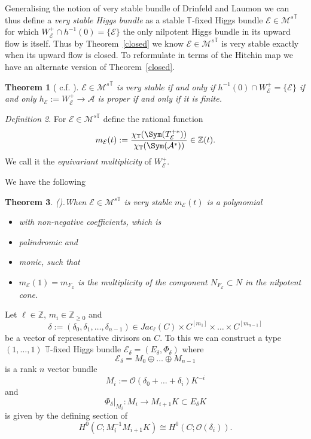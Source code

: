 \documentclass[12pt]{article}
\numberwithin{equation}{section}
\newtheorem{theorem}{Theorem}
\theoremstyle{remark}
\newtheorem{definition}[theorem]{Definition}
\numberwithin{theorem}{section}
\def\calE{{\mathcal E}}
\def\M{{\mathcal{M}}}
\def\calA{{\mathcal{A}}}
\def\N{\mathbb{Z}_{\geq 0}}
\newcommand{\T}{{\mathbb{T}}}
\def\calO{{\mathcal O}}
\def\Z{\mathbb{Z}}
\numberwithin{equation}{section}
\begin{document}
Generalising the notion of very stable bundle of Drinfeld and Laumon \cite{drinfeld2,laumon1} we can thus define a {\em very stable Higgs bundle} as a stable $\T$-fixed Higgs bundle $\calE\in {\M^s}^\T$ for which $W^+_\calE\cap h^{-1}(0)=\{\calE\}$ the only nilpotent Higgs bundle in its upward flow is itself. Thus by Theorem~\ref{closed} we know $\calE\in  {\M^s}^\T$ is very stable exactly when its upward flow is closed. To reformulate in terms of the Hitchin map we have an alternate version of Theorem~\ref{closed}.
\begin{theorem}[\cite{hausel-hitchin1} c.f. \cite{zelaci}] \label{proper}
	$\calE \in {\M^s}^\T$ is very stable if and only if $h^{-1}({0})\cap W^+_\calE=\{\calE\}$ if and only $h_\calE:=W_\calE^+\to \calA$ is proper if and only if it is finite. 
\end{theorem}

\begin{definition}\label{equmult} For $\calE\in \M^{s
		\T}$ define the rational function $$m_{\calE}(t):={{ \chi_\T(\Sym(T^{+*}_\calE))\over \chi_\T(\Sym(\calA^*))}}\in \Z(t).$$ %
	We call it the {\em equivariant multiplicity} of $W^+_\calE$. 
\end{definition}
We have the following
\begin{theorem}(\cite[Corollary 5.4]{hausel-hitchin}).\label{eqmul}
	When $\calE\in \M^{s
		\T}$ is very stable $m_{\calE}(t)$ is a polynomial \begin{itemize}  \item with non-negative coefficients, which is \item palindromic and \item monic, such that \item $m_{\calE}(1)=m_{F_\calE}$ is the multiplicity of the component $N_{F_\calE}\subset N$ in the nilpotent cone. \end{itemize}
\end{theorem}

Let $\ell\in \Z$, $m_i\in \N$ and $$\delta:=(\delta_0,\delta_1,\dots,\delta_{n-1})\in Jac_\ell(C)\times C^{[m_1]}\times \dots \times C^{[m_{n-1}]}$$ be a vector of representative divisors on $C$. To this we can construct a type $(1,\dots,1)$ $\T$-fixed Higgs bundle $\calE_\delta=(E_\delta,\Phi_\delta)$ where $$\calE_\delta=M_0\oplus\dots \oplus M_{n-1}$$ is a rank $n$ vector bundle $$M_i:=\calO(\delta_0+\dots+\delta_i)K^{-i}$$ and $$\Phi_\delta|_{M_i}:M_i\to M_{i+1}K\subset E_\delta K$$ is given by the defining section of $$H^0(C;M_i^{-1}M_{i+1}K)\cong H^0(C;\calO(\delta_i)).$$
\end{document}
